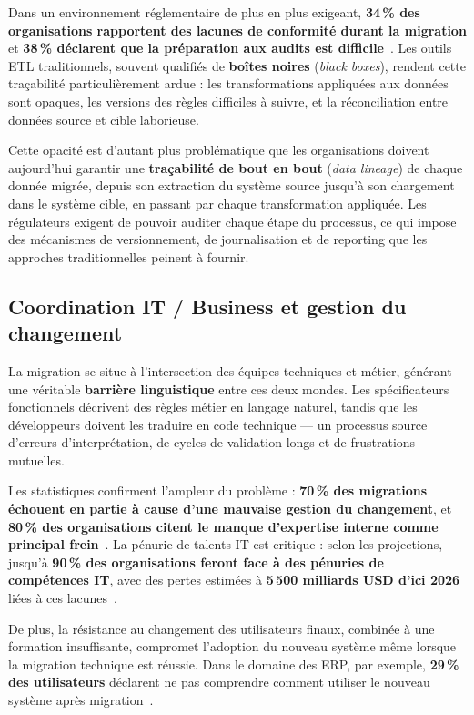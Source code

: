 Dans un environnement réglementaire de plus en plus exigeant,
\textbf{34\,\% des organisations rapportent des lacunes de conformité
durant la migration} et \textbf{38\,\% déclarent que la préparation aux
audits est difficile}~\cite{gitnux_cloud, admp_overview}. Les outils ETL
traditionnels, souvent qualifiés de \textbf{boîtes noires} (\textit{black
boxes}), rendent cette traçabilité particulièrement ardue : les
transformations appliquées aux données sont opaques, les versions des règles
difficiles à suivre, et la réconciliation entre données source et cible
laborieuse.

Cette opacité est d'autant plus problématique que les organisations doivent
aujourd'hui garantir une \textbf{traçabilité de bout en bout}
(\textit{data lineage}) de chaque donnée migrée, depuis son extraction du
système source jusqu'à son chargement dans le système cible, en passant par
chaque transformation appliquée. Les régulateurs exigent de pouvoir auditer
chaque étape du processus, ce qui impose des mécanismes de versionnement,
de journalisation et de reporting que les approches traditionnelles peinent
à fournir.

\subsection{Coordination IT / Business et gestion du changement}

La migration se situe à l'intersection des équipes techniques et métier,
générant une véritable \textbf{barrière linguistique} entre ces deux
mondes. Les spécificateurs fonctionnels décrivent des règles métier en
langage naturel, tandis que les développeurs doivent les traduire en code
technique --- un processus source d'erreurs d'interprétation, de cycles de
validation longs et de frustrations mutuelles.

Les statistiques confirment l'ampleur du problème : \textbf{70\,\% des
migrations échouent en partie à cause d'une mauvaise gestion du changement},
et \textbf{80\,\% des organisations citent le manque d'expertise interne
comme principal frein}~\cite{worldmetrics2025, wifitalents2025}. La pénurie
de talents IT est critique : selon les projections, jusqu'à \textbf{90\,\%
des organisations feront face à des pénuries de compétences IT}, avec des
pertes estimées à \textbf{5\,500 milliards USD d'ici 2026} liées à ces
lacunes~\cite{integrate_io_stats}.

De plus, la résistance au changement des utilisateurs finaux, combinée à
une formation insuffisante, compromet l'adoption du nouveau système même
lorsque la migration technique est réussie. Dans le domaine des ERP, par
exemple, \textbf{29\,\% des utilisateurs} déclarent ne pas comprendre
comment utiliser le nouveau système après migration~\cite{godlan_erp}.

